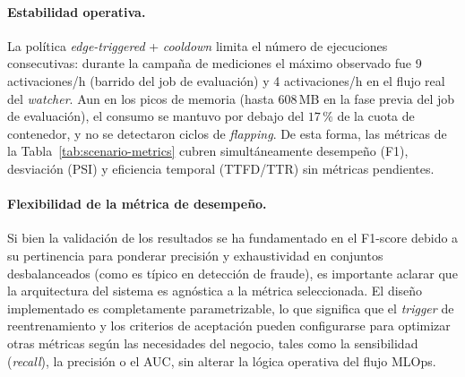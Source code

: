 \paragraph{Estabilidad operativa.}
La política \textit{edge-triggered} + \textit{cooldown} limita el número de ejecuciones consecutivas: durante la campaña de mediciones el máximo observado fue 9 activaciones/h (barrido del job de evaluación) y 4 activaciones/h en el flujo real del \textit{watcher}. Aun en los picos de memoria (hasta $608$\,MB en la fase previa del job de evaluación), el consumo se mantuvo por debajo del $17\,\%$ de la cuota de contenedor, y no se detectaron ciclos de \textit{flapping}. De esta forma, las métricas de la Tabla~\ref{tab:scenario-metrics} cubren simultáneamente desempeño (F1), desviación (PSI) y eficiencia temporal (TTFD/TTR) sin métricas pendientes.


\paragraph{Flexibilidad de la métrica de desempeño.}
Si bien la validación de los resultados se ha fundamentado en el F1-score debido a su pertinencia para ponderar precisión y exhaustividad en conjuntos desbalanceados (como es típico en detección de fraude), es importante aclarar que la arquitectura del sistema es agnóstica a la métrica seleccionada. El diseño implementado es completamente parametrizable, lo que significa que el \textit{trigger} de reentrenamiento y los criterios de aceptación pueden configurarse para optimizar otras métricas según las necesidades del negocio, tales como la sensibilidad (\textit{recall}), la precisión o el AUC, sin alterar la lógica operativa del flujo MLOps.


